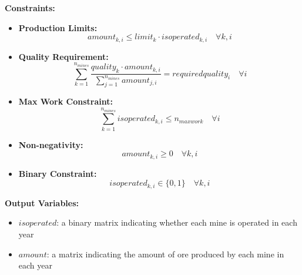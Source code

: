 \documentclass{article}
\begin{document}
\textbf{Constraints:}
\begin{itemize}
    \item \textbf{Production Limits:}
    \[
    amount_{k,i} \leq limit_k \cdot isoperated_{k,i} \quad \forall k, i
    \]
    
    \item \textbf{Quality Requirement:}
    \[
    \sum_{k=1}^{n_{mines}} \frac{quality_k \cdot amount_{k,i}}{\sum_{j=1}^{n_{mines}} amount_{j,i}} = requiredquality_i \quad \forall i
    \]
    
    \item \textbf{Max Work Constraint:}
    \[
    \sum_{k=1}^{n_{mines}} isoperated_{k,i} \leq n_{maxwork} \quad \forall i
    \]
    
    \item \textbf{Non-negativity:}
    \[
    amount_{k,i} \geq 0 \quad \forall k, i
    \]
    
    \item \textbf{Binary Constraint:}
    \[
    isoperated_{k,i} \in \{0, 1\} \quad \forall k, i
    \]
\end{itemize}

\textbf{Output Variables:}
\begin{itemize}
    \item $isoperated$: a binary matrix indicating whether each mine is operated in each year
    \item $amount$: a matrix indicating the amount of ore produced by each mine in each year
\end{itemize}
\end{document}
